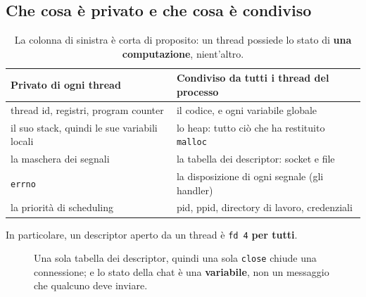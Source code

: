 \subsection{Che cosa è privato e che cosa è condiviso}

\begin{table}[H]
\centering
\begin{tabular}{l l}
\toprule
\textbf{Privato di ogni thread} & \textbf{Condiviso da tutti i thread del processo} \\
\midrule
thread id, registri, program counter & il codice, e ogni variabile globale \\
il suo stack, quindi le sue variabili locali & lo heap: tutto ciò che ha restituito \texttt{malloc} \\
la maschera dei segnali & la tabella dei descriptor: socket e file \\
\texttt{errno} & la disposizione di ogni segnale (gli handler) \\
la priorità di scheduling & pid, ppid, directory di lavoro, credenziali \\
\bottomrule
\end{tabular}
\caption{La colonna di sinistra è corta di proposito: un thread possiede lo stato di \textbf{una computazione}, nient'altro.}
\end{table}

In particolare, un descriptor aperto da un thread è \texttt{fd 4} \textbf{per tutti}.

\begin{figure}[H]
\centering
{}
\caption{Una sola tabella dei descriptor, quindi una sola \texttt{close} chiude una connessione; e lo stato della chat è
         una \textbf{variabile}, non un messaggio che qualcuno deve inviare.}
\end{figure}

